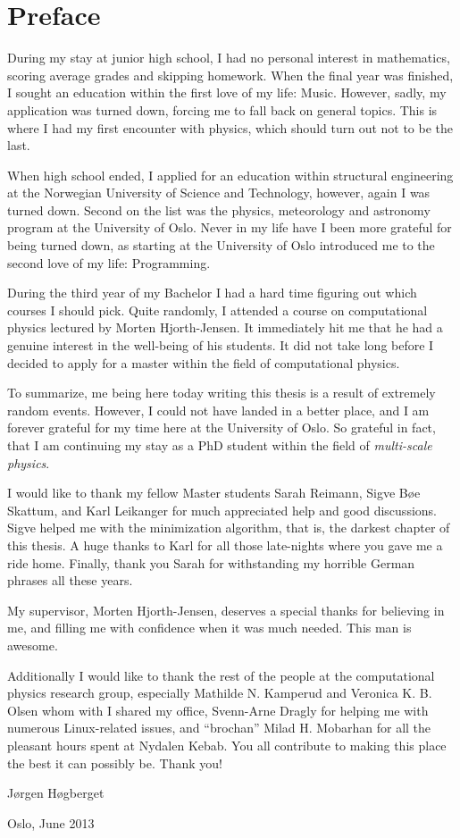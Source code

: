 \chapter*{Preface}

During my stay at junior high school, I had no personal interest in mathematics, scoring average grades and skipping homework. When the final year was finished, I sought an education within the first love of my life: Music. However, sadly, my application was turned down, forcing me to fall back on general topics. This is where I had my first encounter with physics, which should turn out not to be the last.

When high school ended, I applied for an education within structural engineering at the Norwegian University of Science and Technology, however, again I was turned down. Second on the list was the physics, meteorology and astronomy program at the University of Oslo. Never in my life have I been more grateful for being turned down, as starting at the University of Oslo introduced me to the second love of my life: Programming. 

During the third year of my Bachelor I had a hard time figuring out which courses I should pick. Quite randomly, I attended a course on computational physics lectured by Morten Hjorth-Jensen. It immediately hit me that he had a genuine interest in the well-being of his students. It did not take long before I decided to apply for a master within the field of computational physics.

To summarize, me being here today writing this thesis is a result of extremely random events. However, I could not have landed in a better place, and I am forever grateful for my time here at the University of Oslo. So grateful in fact, that I am continuing my stay as a PhD student within the field of \textit{multi-scale physics}.

I would like to thank my fellow Master students Sarah Reimann, Sigve B\o{}e Skattum, and Karl Leikanger for much appreciated help and good discussions. Sigve helped me with the minimization algorithm, that is, the darkest chapter of this thesis. A huge thanks to Karl for all those late-nights where you gave me a ride home. Finally, thank you Sarah for withstanding my horrible German phrases all these years. 

My supervisor, Morten Hjorth-Jensen, deserves a special thanks for believing in me, and filling me with confidence when it was much needed. This man is awesome.  

Additionally I would like to thank the rest of the people at the computational physics research group, especially Mathilde N. Kamperud and Veronica K. B. Olsen whom with I shared my office, Svenn-Arne Dragly for helping me with numerous Linux-related issues, and ``brochan'' Milad H. Mobarhan for all the pleasant hours spent at Nydalen Kebab. You all contribute to making this place the best it can possibly be. Thank you!


\hfill J\o{}rgen H\o{}gberget

Oslo, June 2013